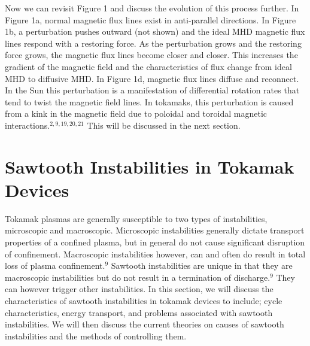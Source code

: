 \documentclass{article}
\begin{document}
Now we can revisit Figure 1 and discuss the evolution of this process further.  In Figure 1a, normal magnetic flux lines exist in anti-parallel directions.  In Figure 1b, a perturbation pushes outward (not shown) and the ideal MHD magnetic flux lines respond with a restoring force.  As the perturbation grows and the restoring force grows, the magnetic flux lines become closer and closer.  This increases the gradient of the magnetic field and the characteristics of flux change from ideal MHD to diffusive MHD.  In Figure 1d, magnetic flux lines diffuse and reconnect.  In the Sun this perturbation is a manifestation of differential rotation rates that tend to twist the magnetic field lines.  In tokamaks, this perturbation is caused from a kink in the magnetic field due to poloidal and toroidal magnetic interactions.$^{2,9,19,20,21}$  This will be discussed in the next section.
\section{Sawtooth Instabilities in Tokamak Devices}
Tokamak plasmas are generally susceptible to two types of instabilities, microscopic and macroscopic.  Microscopic instabilities generally dictate transport properties of a confined plasma, but in general do not cause significant disruption of confinement.  Macroscopic instabilities however, can and often do result in total loss of plasma confinement.$^{9}$  Sawtooth instabilities are unique in that they are macroscopic instabilities but do not result in a termination of discharge.$^{9}$  They can however trigger other instabilities.  In this section, we will discuss the characteristics of sawtooth instabilities in tokamak devices to include; cycle characteristics, energy transport, and problems associated with sawtooth instabilities.  We will then discuss the current theories on causes of sawtooth instabilities and the methods of controlling them.
\end{document}
